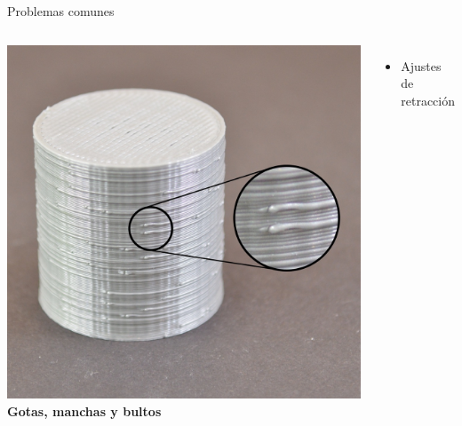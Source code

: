 \documentclass{beamer}
\begin{document}
	\begin{frame}{Problemas comunes}
		\begin{columns}
				\includegraphics[width=\textwidth]{images/Blobs-And-Zits}
				\textbf{Gotas, manchas y bultos}
				\begin{itemize}
					\item Ajustes de retracción
				\end{itemize}
		\end{columns}
	\end{frame}
\end{document}
